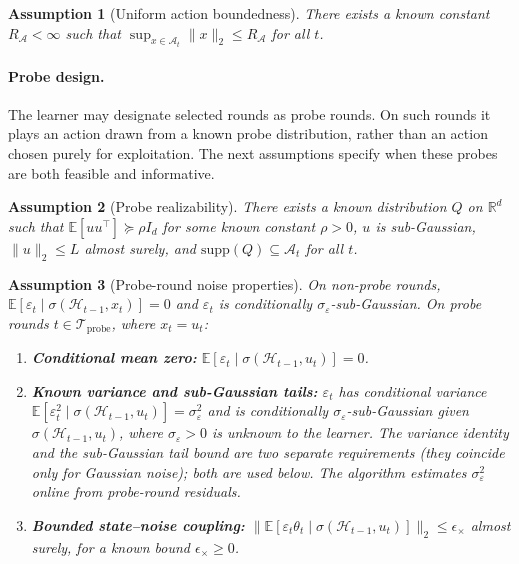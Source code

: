 \documentclass[11pt]{article}
\newcommand{\R}{\mathbb{R}}
\newcommand{\E}{\mathbb{E}}
\newcommand{\cA}{\mathcal{A}}
\newcommand{\cH}{\mathcal{H}}
\newcommand{\cTprobe}{\mathcal{T}_{\mathrm{probe}}}
\newcommand{\supp}{\mathrm{supp}}
\newtheorem{assumption}{Assumption}
\begin{document}
\begin{assumption}[Uniform action boundedness]
\label{assum:action_boundedness}
There exists a known constant $R_{\cA}<\infty$ such that
$\sup_{x\in\cA_t}\|x\|_2\le R_{\cA}$ for all $t$.
\end{assumption}

\paragraph{Probe design.}
The learner may designate selected rounds as probe rounds.
On such rounds it plays an action drawn from a known probe distribution,
rather than an action chosen purely for exploitation.
The next assumptions specify when these probes are both feasible and informative.

\begin{assumption}[Probe realizability]
\label{assum:probe_realizability}
There exists a known distribution $Q$ on $\R^d$ such that
$\E[uu^\top]\succeq\rho I_d$ for some known constant $\rho>0$,
$u$ is sub-Gaussian,
$\|u\|_2\le L$ almost surely,
and $\supp(Q)\subseteq\cA_t$ for all $t$.
\end{assumption}

\begin{assumption}[Probe-round noise properties]
\label{assum:probe_noise}
On non-probe rounds, $\E[\varepsilon_t\mid\sigma(\cH_{t-1},x_t)]=0$ and $\varepsilon_t$
is conditionally $\sigma_\varepsilon$-sub-Gaussian.
On probe rounds $t\in\cTprobe$, where $x_t=u_t$:
\begin{enumerate}[label=(\roman*)]
  \item \textbf{Conditional mean zero:}
  $\E[\varepsilon_t\mid\sigma(\cH_{t-1},u_t)]=0$.
  \item \textbf{Known variance and sub-Gaussian tails:}
  $\varepsilon_t$ has conditional variance
  $\E[\varepsilon_t^2\mid\sigma(\cH_{t-1},u_t)]=\sigma_\varepsilon^2$ and is
  conditionally $\sigma_\varepsilon$-sub-Gaussian given
  $\sigma(\cH_{t-1},u_t)$, where $\sigma_\varepsilon>0$ is \emph{unknown} to the
  learner.  The variance identity and the sub-Gaussian tail bound are \emph{two
  separate requirements} (they coincide only for Gaussian noise); both are used
  below.  The algorithm estimates $\sigma_\varepsilon^2$ online from probe-round
  residuals.
  \item \textbf{Bounded state--noise coupling:}
  $\bigl\|\E[\varepsilon_t\theta_t\mid\sigma(\cH_{t-1},u_t)]\bigr\|_2
  \le\epsilon_\times$ almost surely, for a known bound $\epsilon_\times\ge 0$.
\end{enumerate}
\end{assumption}
\end{document}
